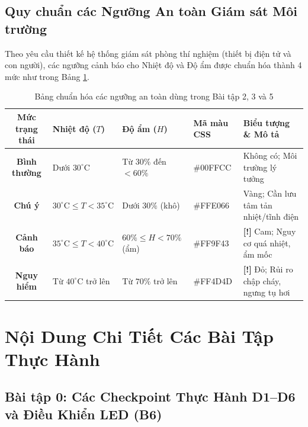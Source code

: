 \subsection{Quy chuẩn các Ngưỡng An toàn Giám sát Môi trường}
Theo yêu cầu thiết kế hệ thống giám sát phòng thí nghiệm (thiết bị điện tử và con người), các ngưỡng cảnh báo cho Nhiệt độ và Độ ẩm được chuẩn hóa thành 4 mức như trong Bảng \ref{tab:safety-thresholds}.

\begin{table}[H]
\centering
\begin{tabularx}{\textwidth}{|>{\bfseries}c|>{\centering\arraybackslash}m{3.2cm}|>{\centering\arraybackslash}m{3.2cm}|>{\ttfamily\centering\arraybackslash}m{2.5cm}|X|}
\hline
\rowcolor{codeframe!40}
\textbf{Mức trạng thái} & \textbf{Nhiệt độ ($T$)} & \textbf{Độ ẩm ($H$)} & \textbf{Mã màu CSS} & \textbf{Biểu tượng \& Mô tả} \\
\hline
Bình thường & Dưới $30^\circ\text{C}$ & Từ $30\%$ đến $< 60\%$ & \#00FFCC & Không có; Môi trường lý tưởng \\
\hline
Chú ý & $30^\circ\text{C} \le T < 35^\circ\text{C}$ & Dưới $30\%$ (khô) & \#FFE066 & Vàng; Cần lưu tâm tản nhiệt/tĩnh điện \\
\hline
Cảnh báo & $35^\circ\text{C} \le T < 40^\circ\text{C}$ & $60\% \le H < 70\%$ (ẩm) & \#FF9F43 & \textbf{[!]} Cam; Nguy cơ quá nhiệt, ẩm mốc \\
\hline
Nguy hiểm & Từ $40^\circ\text{C}$ trở lên & Từ $70\%$ trở lên & \#FF4D4D & \textbf{[!]} Đỏ; Rủi ro chập cháy, ngưng tụ hơi \\
\hline
\end{tabularx}
\caption{Bảng chuẩn hóa các ngưỡng an toàn dùng trong Bài tập 2, 3 và 5}
\label{tab:safety-thresholds}
\end{table}

\newpage
\section{Nội Dung Chi Tiết Các Bài Tập Thực Hành}

\subsection{Bài tập 0: Các Checkpoint Thực Hành D1--D6 và Điều Khiển LED (B6)}

